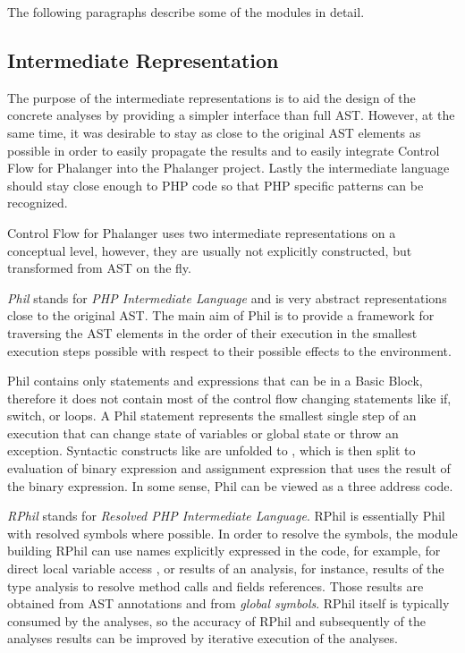     The following paragraphs describe some of the 
    modules in detail.

    \subsection{Intermediate Representation}
    The purpose of the intermediate representations is 
    to aid the design of the concrete analyses by 
    providing a simpler interface than full AST.
    However, at the same time, it was desirable to stay as 
    close to the original AST elements as possible in order 
    to easily propagate the results and to easily integrate 
    Control Flow for Phalanger into the Phalanger project.         
    Lastly the intermediate language should stay close enough 
    to PHP code so that PHP specific patterns can be recognized.    
    
    Control Flow for Phalanger uses two intermediate representations 
    on a conceptual level, however, they are usually not explicitly 
    constructed, but transformed from AST on the fly.
    
    \emph{Phil} stands for \emph{PHP Intermediate Language} and is 
    very abstract representations close to the original AST. 
    The main aim of Phil is to provide a framework for 
    traversing the AST elements in the order of their 
    execution in the smallest execution steps possible 
    with respect to their possible effects to the environment.     
    
    Phil contains only statements and expressions that can be 
    in a Basic Block, therefore it does not contain most of the 
    control flow changing statements like if, switch, or loops. 
    A Phil statement represents the smallest single step 
    of an execution that can change state of variables 
    or global state or throw an exception. Syntactic 
    constructs like  are unfolded to 
    , which is then split to 
    evaluation of binary expression and assignment expression 
    that uses the result of the binary expression. In some sense, 
    Phil can be viewed as a three address code.
    
    \emph{RPhil} stands for \emph{Resolved PHP Intermediate Language}. 
    RPhil is essentially Phil with resolved symbols where possible. 
    In order to resolve the symbols, the module building RPhil 
    can use names explicitly expressed in the code, for example, 
    for direct local variable access , or results of 
    an analysis, for instance, results of the type analysis to 
    resolve method calls and fields references. Those results 
    are obtained from AST annotations and from \emph{global symbols}.
    RPhil itself is typically consumed by the analyses, 
    so the accuracy of RPhil and subsequently of the 
    analyses results can be improved by iterative execution 
    of the analyses.
    
